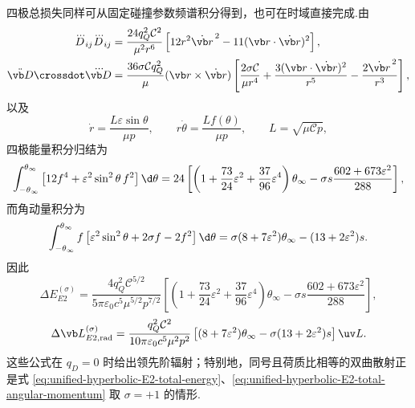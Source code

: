 四极总损失同样可从固定碰撞参数频谱积分得到，也可在时域直接完成.由
\begin{equation}
 \begin{aligned}
 \dddot D_{ij}\dddot D_{ij}
 &=\frac{24q_Q^2\mathcal C^2}{\mu^2r^6}
 \left[12r^2\dot{\vb r}^{\,2}
 -11(\vb r\cdot\dot{\vb r})^2\right],\\
 \ddot{\vb D}\crossdot\dddot{\vb D}
 &=\frac{36\sigma\mathcal C q_Q^2}{\mu}
 (\vb r\times\dot{\vb r})
 \left[
 \frac{2\sigma\mathcal C}{\mu r^4}
 +\frac{3(\vb r\cdot\dot{\vb r})^2}{r^5}
 -\frac{2\dot{\vb r}^{\,2}}{r^3}
 \right],
 \end{aligned}
 \label{eq:quadrupole-time-domain-coulomb-invariants}
\end{equation}
以及
\begin{equation}
 \dot r=\frac{L\varepsilon\sin\theta}{\mu p},
 \qquad
 r\dot\theta=\frac{Lf(\theta)}{\mu p},
 \qquad
 L=\sqrt{\mu\mathcal C p},
\end{equation}
四极能量积分归结为
\begin{equation}
 \int_{-\theta_\infty}^{\theta_\infty}
 \left[12f^4+\varepsilon^2\sin^2\theta\,f^2\right]\d\theta
 =24\left[
 \left(1+\frac{73}{24}\varepsilon^2+\frac{37}{96}\varepsilon^4\right)\theta_\infty
 -\sigma s\frac{602+673\varepsilon^2}{288}
 \right],
 \label{eq:quadrupole-hyperbolic-energy-integral}
\end{equation}
而角动量积分为
\begin{equation}
 \int_{-\theta_\infty}^{\theta_\infty}
 f\left[\varepsilon^2\sin^2\theta+2\sigma f-2f^2\right]\d\theta
 =\sigma(8+7\varepsilon^2)\theta_\infty
 -(13+2\varepsilon^2)s.
 \label{eq:quadrupole-hyperbolic-angular-integral}
\end{equation}
因此
\begin{equation}
 \Delta E_{E2}^{(\sigma)}
 =\frac{4q_Q^2\mathcal C^{5/2}}
 {5\pi\varepsilon_0c^5\mu^{5/2}p^{7/2}}
 \left[
 \left(1+\frac{73}{24}\varepsilon^2+\frac{37}{96}\varepsilon^4\right)\theta_\infty
 -\sigma s\frac{602+673\varepsilon^2}{288}
 \right],
 \label{eq:unified-hyperbolic-E2-total-energy}
\end{equation}
\begin{equation}
 \Delta\vb L_{E2,\mathrm{rad}}^{(\sigma)}
 =\frac{q_Q^2\mathcal C^2}
 {10\pi\varepsilon_0c^5\mu^2p^2}
 \left[
 (8+7\varepsilon^2)\theta_\infty
 -\sigma(13+2\varepsilon^2)s
 \right]\uv L.
 \label{eq:unified-hyperbolic-E2-total-angular-momentum}
\end{equation}
这些公式在 $q_D=0$ 时给出领先阶辐射；特别地，同号且荷质比相等的双曲散射正是式 \eqref{eq:unified-hyperbolic-E2-total-energy}、\eqref{eq:unified-hyperbolic-E2-total-angular-momentum} 取 $\sigma=+1$ 的情形.

